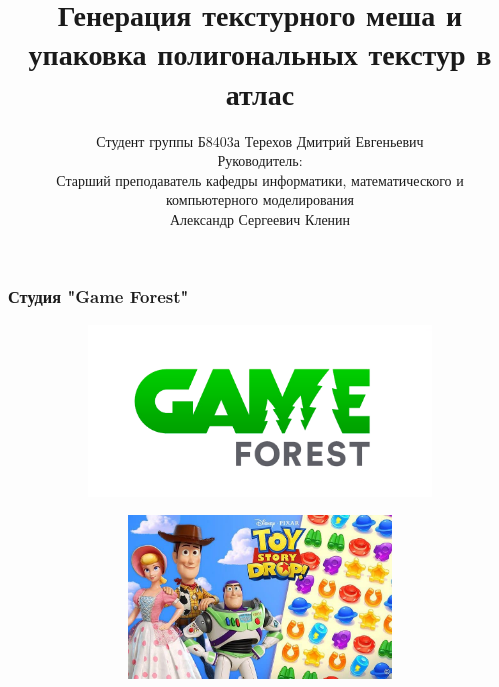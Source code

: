 \documentclass[10pt, unicode]{beamer}
\title{Генерация текстурного меша и упаковка полигональных текстур в атлас}
\author[Терехов Д.Е.]{Студент группы Б8403а Терехов Дмитрий Евгеньевич\\
Руководитель:\\
Старший преподаватель кафедры информатики, математического и компьютерного моделирования\\
Александр Сергеевич Кленин}
\date{}
\begin{document}
    \begin{frame}[fragile]
        \titlepage
        \thispagestyle{empty}
    \end{frame}
    \begin{frame}
        \frametitle{Студия "Game Forest"}
        \begin{figure}[H]
            \centering
            \begin{subfigure}[l]{0.50\linewidth}
                \centering
                \includegraphics[scale=0.15]{GAMEFOREST.png}
            \end{subfigure}
            \begin{subfigure}{0.49\linewidth}
                \begin{subfigure}{\linewidth}
                    \centering
                    \includegraphics[scale=0.15]{TSD.jpg}
                \end{subfigure}
                \begin{subfigure}{\linewidth}
                    \centering

\end{subfigure}
\end{subfigure}
\end{figure}
\end{frame}
\end{document}
